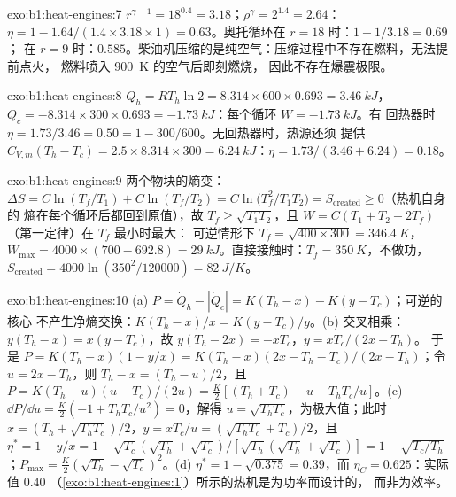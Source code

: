 \begin{solution}{exo:b1:heat-engines:7}
$r^{\gamma-1} = 18^{0.4} = 3.18$；$\rho^\gamma = 2^{1.4} = 2.64$：$\eta = 1 -
1.64/(1.4 \times 3.18 \times 1) = 0.63$。奥托循环在 $r = 18$ 时：$1 - 1/3.18 = 0.69$；
在 $r = 9$ 时：$0.585$。柴油机压缩的是纯空气：压缩过程中不存在燃料，无法提前点火，
燃料喷入 \qty{900}{K} 的空气后即刻燃烧，
因此不存在爆震极限。
\end{solution}

\begin{solution}{exo:b1:heat-engines:8}
$Q_h = RT_h\ln2 = 8.314 \times 600 \times 0.693 = \qty{3.46}{kJ}$，$Q_c = -8.314
\times 300 \times 0.693 = \qty{-1.73}{kJ}$：每个循环 $W = \qty{-1.73}{kJ}$。有
回热器时 $\eta = 1.73/3.46 = 0.50 = 1 - 300/600$。无回热器时，热源还须
提供 $C_{V,m}(T_h - T_c) = 2.5 \times 8.314 \times 300 =
\qty{6.24}{kJ}$：$\eta = 1.73/(3.46 + 6.24) = 0.18$。
\end{solution}

\begin{solution}{exo:b1:heat-engines:9}
两个物块的熵变：$\Delta S = C\ln(T_f/T_1) + C\ln(T_f/T_2) =
C\ln\bigl(T_f^2/T_1T_2\bigr) = S_{\mathrm{created}} \geq 0$（热机自身的
熵在每个循环后都回到原值），故 $T_f \geq \sqrt{T_1T_2}$，且
$W = C(T_1 + T_2 - 2T_f)$（第一定律）在 $T_f$ 最小时最大：
可逆情形下 $T_f = \sqrt{400 \times 300} = \qty{346.4}{K}$，
$W_{\max} = 4000 \times (700 - 692.8) = \qty{29}{kJ}$。直接接触时：$T_f =
\qty{350}{K}$，不做功，$S_{\mathrm{created}} = 4000\ln(350^2/120000) =
\qty{82}{J/K}$。
\end{solution}

\begin{solution}{exo:b1:heat-engines:10}
(a) $P = \dot Q_h - |\dot Q_c| = K(T_h - x) - K(y - T_c)$；可逆的核心
不产生净熵交换：$K(T_h - x)/x = K(y - T_c)/y$。(b) 交叉相乘：
$y(T_h - x) = x(y - T_c)$，故 $y(T_h - 2x) = -xT_c$，$y = xT_c/(2x - T_h)$。
于是 $P = K(T_h - x)(1 - y/x) = K(T_h - x)(2x - T_h - T_c)/(2x - T_h)$；令
$u = 2x - T_h$，则 $T_h - x = (T_h - u)/2$，且 $P = K(T_h - u)(u - T_c)/(2u) =
\tfrac{K}{2}[(T_h + T_c) - u - T_hT_c/u]$。(c) $\dd P/\dd u = \tfrac K2(-1 +
T_hT_c/u^2) = 0$，解得 $u = \sqrt{T_hT_c}$，为极大值；此时 $x = (T_h +
\sqrt{T_hT_c})/2$，$y = xT_c/u = (\sqrt{T_hT_c} + T_c)/2$，且 $\eta^\ast = 1 - y/x
= 1 - \sqrt{T_c}(\sqrt{T_h} + \sqrt{T_c})/[\sqrt{T_h}(\sqrt{T_h} + \sqrt{T_c})] = 1 -
\sqrt{T_c/T_h}$；$P_{\max} = \tfrac K2(\sqrt{T_h} - \sqrt{T_c})^2$。(d)
$\eta^\ast = 1 - \sqrt{0.375} = 0.39$，而 $\eta_C = 0.625$：实际值 $0.40$
（\cref{exo:b1:heat-engines:1}）所示的热机是为功率而设计的，
而非为效率。
\end{solution}

